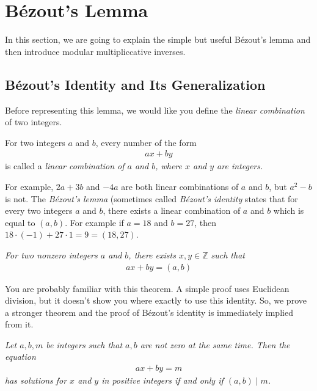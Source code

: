 \documentclass{subfile}
\begin{document}
	\section{B\'{e}zout's Lemma}
	
	In this section, we are going to explain the simple but useful B\'{e}zout's lemma and then introduce modular multipliccative inverses.
	
	\subsection{B\'{e}zout's Identity and Its Generalization}
	Before representing this lemma, we would like you define the \textit{linear combination} of two integers.
	
	\begin{definition}\label{def:linearcombination}
		For two integers $a$ and $b$, every number of the form
		\begin{align*} ax+by\end{align*}
		is called a \itshape{linear combination} of $a$ and $b$, where $x$ and $y$ are integers.
	\end{definition}
	
	For example, $2a+3b$ and $-4a$ are both linear combinations of $a$ and $b$, but $a^2-b$ is not. The \textit{B\'{e}zout's lemma} (sometimes called \textit{B\'{e}zout's identity} states that for every two integers $a$ and $b$, there exists a linear combination of $a$ and $b$ which is equal to $(a,b)$. For example if $a=18$ and $b=27$, then $18 \cdot (-1) + 27 \cdot 1 = 9 =(18,27)$.
	
	\begin{theorem}  \slshape
		For two nonzero integers $a$ and $b$, there exists $x, y \in \mathbb Z$ such that
		\begin{align*}
		ax+by = (a,b)
		\end{align*}
	\end{theorem}
	
	You are probably familiar with this theorem. A simple proof uses Euclidean division, but it doesn't show you where exactly to use this identity. So, we prove a stronger theorem and the proof of B\'{e}zout's identity is immediately implied from it.
	
	\begin{theorem}\slshape \label{thm:equationgcd}
		Let $a,b,m$ be integers such that $a, b$ are not zero at the same time. Then the equation
		\begin{align*} ax + by = m\end{align*}
		has solutions for $x$ and $y$ in positive integers if and only if $(a,b)\mid m$.
	\end{theorem}
	
\end{document}
